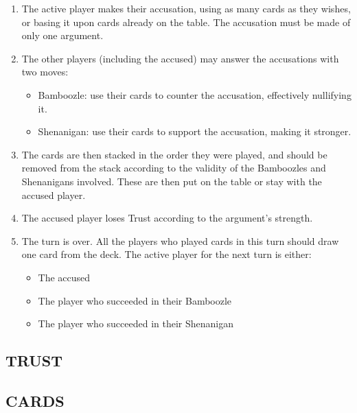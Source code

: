 \documentclass[a4paper, 11pt]{article}
\begin{document}
	\begin{enumerate}
		\item The active player makes their accusation, using as many cards as they wishes, or basing it upon cards already on the table. The accusation must be made of only one argument.

		\item The other players (including the accused) may answer the accusations with two moves:
			\begin{itemize}
				\item Bamboozle: use their cards to counter the accusation, effectively nullifying it.

				\item Shenanigan: use their cards to support the accusation, making it stronger.
			\end{itemize}

		\item The cards are then stacked in the order they were played, and should be removed from the stack according to the validity of the Bamboozles and Shenanigans involved. These are then put on the table or stay with the accused player.

		\item The accused player loses Trust according to the argument's strength.

		\item The turn is over. All the players who played cards in this turn should draw one card from the deck. The active player for the next turn is either:
			 \begin{itemize}
				\item The accused

				\item The player who succeeded in their Bamboozle

				\item The player who succeeded in their Shenanigan
			\end{itemize}

	\end{enumerate}

\subsection*{TRUST}

\subsection*{CARDS}
\end{document}

